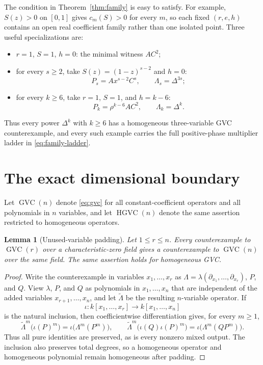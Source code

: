 \documentclass[11pt]{article}
\newtheorem{lemma}[theorem]{Lemma}
\begin{document}
The condition in Theorem~\ref{thm:family} is easy to satisfy.  For example,
$S(z)>0$ on $[0,1]$ gives $c_m(S)>0$ for every $m$, so each fixed
$(r,e,h)$ contains an open real coefficient family rather than one isolated
point.  Three useful specializations are:
\begin{itemize}
 \item $r=1$, $S=1$, $h=0$: the minimal witness $AC^2$;
 \item for every $s\geq2$, take $S(z)=(1-z)^{s-2}$ and $h=0$:
 \[
   P_s=Ax^{s-2}C^s,
   \qquad \Lambda_s=\Delta^{3s};
 \]
 \item for every $k\geq6$, take $r=1$, $S=1$, and $h=k-6$:
 \begin{equation}\label{eq:radial-family}
   P_k=\rho^{k-6}AC^2,
   \qquad \Lambda_k=\Delta^k.
 \end{equation}
\end{itemize}
Thus every power $\Delta^k$ with $k\geq6$ has a homogeneous
three-variable GVC counterexample, and every such example carries the full
positive-phase multiplier ladder in \eqref{eq:family-ladder}.

\section{The exact dimensional boundary}

Let $\operatorname{GVC}(n)$ denote \eqref{eq:gvc} for all
constant-coefficient operators and all polynomials in $n$ variables, and
let $\operatorname{HGVC}(n)$ denote the same assertion restricted to
homogeneous operators.

\begin{lemma}[Unused-variable padding]\label{lem:padding}
Let $1\leq r\leq n$.  Every counterexample to $\operatorname{GVC}(r)$
over a characteristic-zero field gives a counterexample to
$\operatorname{GVC}(n)$ over the same field.  The same assertion holds for
homogeneous GVC.
\end{lemma}

\begin{proof}
Write the counterexample in variables $x_1,\ldots,x_r$ as
$\Lambda=\lambda(\partial_{x_1},\ldots,\partial_{x_r})$, $P$, and $Q$.
View $\lambda$, $P$, and $Q$ as polynomials in
$x_1,\ldots,x_n$ that are independent of the added variables
$x_{r+1},\ldots,x_n$, and let $\widetilde\Lambda$ be the resulting
$n$-variable operator.  If
\[
 \iota:k[x_1,\ldots,x_r]\longrightarrow k[x_1,\ldots,x_n]
\]
is the natural inclusion, then coefficientwise differentiation gives, for
every $m\geq1$,
\[
 \widetilde\Lambda^m\bigl(\iota(P)^m\bigr)
 =\iota\bigl(\Lambda^m(P^m)\bigr),
 \qquad
 \widetilde\Lambda^m\bigl(\iota(Q)\iota(P)^m\bigr)
 =\iota\bigl(\Lambda^m(QP^m)\bigr).
\]
Thus all pure identities are preserved, as is every nonzero mixed output.
The inclusion also preserves total degrees, so a homogeneous operator and
homogeneous polynomial remain homogeneous after padding.
\end{proof}
\end{document}
